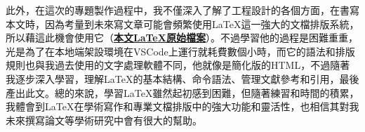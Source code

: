 \documentclass[12pt,a4paper]{article}
\begin{document}
\begin{CJK*}{UTF8}{bkai}
    此外，在這次的專題製作過程中，我不僅深入了解了工程設計的各個方面，在書寫本文時，因為考量到未來寫文章可能會頻繁使用\LaTeX 這一強大的文檔排版系統，所以藉這此機會使用它（\href{https://github.com/moon-jam/engineering_design_learning_portfolio}{\bf{本文\LaTeX 原始檔案}}）。不過學習他的過程是困難重重，光是為了在本地端架設環境在VSCode上運行就耗費數個小時，而它的語法和排版規則也與我過去使用的文字處理軟體不同，他就像是簡化版的HTML，不過隨著我逐步深入學習，理解\LaTeX 的基本結構、命令語法、管理文獻參考和引用，最後產出此文。總的來說，學習\LaTeX 雖然起初感到困難，但隨著練習和時間的積累，我體會到\LaTeX 在學術寫作和專業文檔排版中的強大功能和靈活性，也相信其對我未來撰寫論文等學術研究中會有很大的幫助。

    \newpage
    \nocite{*}
    
    

\end{CJK*}
\end{document}
